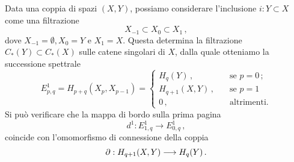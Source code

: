 


\begin{ex}
	Data una  coppia di spazi $(X,Y)$, possiamo considerare
	l'inclusione $i : Y \subset X$ come una filtrazione	
	\begin{equation*}
		 X_{-1} \subset X_{0} \subset X_{1}\,,
	\end{equation*}
	dove $X_{-1} = \emptyset, X_{0}=Y$ e $X_{1}=X$.
	Questa %
	determina la filtrazione $C_{*}(Y) \subset C_{*}(X)$ 
	sulle catene singolari di $X$,
	dalla quale otteniamo la successione spettrale
	\begin{equation}\label{SS-coppia}
		E^{1}_{p,q} = H_{p+q}(X_{p},X_{p-1}) = 
		\begin{cases}
			H_{q}(Y) \,, \quad &\text{se } p=0\,; \\
			H_{q+1}(X,Y) \,, \quad &\text{se } p=1\,\\
			0\,, \quad &\text{altrimenti.}
		\end{cases}
	\end{equation}
	Si può verificare che la mappa di bordo sulla prima pagina
	\begin{equation*}
		d^{1}: E^{1}_{1,q} \longrightarrow E^{1}_{0,q}\,,
	\end{equation*}
	coincide con l'omomorfismo di connessione della coppia
	\begin{equation*}
		\partial : H_{q+1}(X,Y) \longrightarrow H_{q}(Y)\,.
	\end{equation*}
	

\end{ex}
